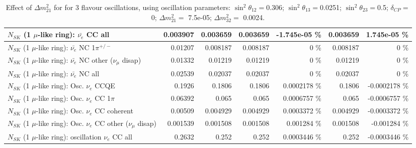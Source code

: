 \begin{table}
\begin{tabular}{| l | r | r | r  r | r  r |}
                            $N_{SK}$ (1 $\mu$-like ring): $\bar{\nu_{e}}$ CC all &        0.003907 &        0.003659 &        0.003659 & -1.745e-05 \%  &        0.003659 & 1.745e-05 \%  \\ 
\hline
                     $N_{SK}$ (1 $\mu$-like ring): $\bar{\nu_e}$ NC 1$\pi^{+/-}$ &         0.01207 &        0.008187 &        0.008187 &        0 \%  &        0.008187 &        0 \%  \\ 
          $N_{SK}$ (1 $\mu$-like ring): $\bar{\nu_e}$ NC other ($\nu_\mu$ disap) &         0.01332 &         0.01219 &         0.01219 &        0 \%  &         0.01219 &        0 \%  \\ 
                            $N_{SK}$ (1 $\mu$-like ring): $\bar{\nu_{e}}$ NC all &         0.02539 &         0.02037 &         0.02037 &        0 \%  &         0.02037 &        0 \%  \\ 
\hline
\hline
\hline
                                 $N_{SK}$ (1 $\mu$-like ring): Osc. $\nu_e$ CCQE &          0.1926 &          0.1806 &          0.1806 & 0.0002178 \%  &          0.1806 & -0.0002178 \%  \\ 
                            $N_{SK}$ (1 $\mu$-like ring): Osc. $\nu_e$ CC 1$\pi$ &         0.06392 &           0.065 &           0.065 & 0.0006757 \%  &           0.065 & -0.0006757 \%  \\ 
                          $N_{SK}$ (1 $\mu$-like ring): Osc. $\nu_e$ CC coherent &         0.00509 &        0.004929 &        0.004929 & 0.0003372 \%  &        0.004929 & -0.0003372 \%  \\ 
           $N_{SK}$ (1 $\mu$-like ring): Osc. $\nu_e$ CC other ($\nu_\mu$ disap) &        0.001539 &        0.001508 &        0.001508 & 0.001284 \%  &        0.001508 & -0.001284 \%  \\ 
                        $N_{SK}$ (1 $\mu$-like ring): oscillation $\nu_e$ CC all &          0.2632 &           0.252 &           0.252 & 0.0003446 \%  &           0.252 & -0.0003446 \%  \\ 
\hline
\hline
\end{tabular}
\caption{ Effect of $\Delta m^2_{21}$ for for 3 flavour oscillations, using oscillation parameters:  $\sin^2\theta_{12} = $0.306; $\sin^2\theta_{13} = $0.0251; $\sin^2\theta_{23} = $0.5; $\delta_{CP} = $        0; $\Delta m^2_{21} = $    7.5e-05; $\Delta m^2_{32} = $    0.0024. }
\label{tab:num_dm12sq_1RmuT_3f_osc_t13:0.0251}
\end{table}
\clearpage
